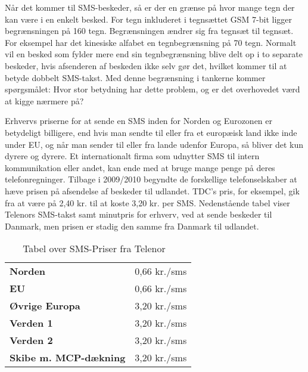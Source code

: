 Når det kommer til SMS-beskeder, så er der en grænse på hvor mange tegn der kan være i en enkelt besked. For tegn inkluderet i tegnsættet GSM 7-bit ligger begrænsningen på 160 tegn. Begrænsningen ændrer sig fra tegnsæt til tegnsæt. For eksempel har det kinesiske alfabet en tegnbegrænsning på 70 tegn\cite{Pro_1}. Normalt vil en besked som fylder mere end sin tegnbegrænsning blive delt op i to separate beskeder, hvis afsenderen af beskeden ikke selv gør det, hvilket kommer til at betyde dobbelt SMS-takst. Med denne begrænsning i tankerne kommer spørgsmålet: Hvor stor betydning har dette problem, og er det overhovedet værd at kigge nærmere på? 

Erhvervs priserne for at sende en SMS inden for Norden og Eurozonen er betydeligt billigere, end hvis man sendte til eller fra et europæisk land ikke inde under EU, og når man sender til eller fra lande udenfor Europa, så bliver det kun dyrere og dyrere. Et internationalt firma som udnytter SMS til intern kommunikation eller andet, kan ende med at bruge mange penge på deres telefonregninger. Tilbage i 2009/2010 begyndte de forskellige telefonselskaber at hæve prisen på afsendelse af beskeder til udlandet. TDC's pris, for eksempel, gik fra at være på 2,40 kr. til at koste 3,20 kr. per SMS\cite{Pro_2}. Nedenstående tabel viser Telenors SMS-takst samt minutpris for erhverv, ved at sende beskeder til Danmark, men prisen er stadig den samme fra Danmark til udlandet\cite{Pro_3_1}.

\begin{table}[H]
\begin{center}
\begin{tabular}{ | l | r |}
    \hline
    \cellcolor{ForestGreen} &  \cellcolor{ForestGreen}\color{white}{\textbf{Sende/Modtage SMS}}\\[2ex] \hline
    \textbf{Norden} & 0,66 kr./sms \\ \hline
    \textbf{EU} & 0,66 kr./sms \\ \hline
    \textbf{Øvrige Europa} & 3,20 kr./sms \\ \hline
    \textbf{Verden 1} & 3,20 kr./sms \\ \hline
    \textbf{Verden 2} & 3,20 kr./sms \\ \hline
    \textbf{Skibe m. MCP-dækning} & 3,20 kr./sms \\ \hline
\end{tabular} 
\caption{Tabel over SMS-Priser fra Telenor ~\cite{Pro_3_2}}
\end{center}
\end{table}

